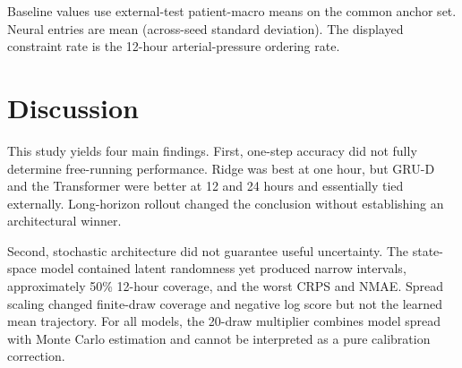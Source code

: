 \documentclass[conference]{IEEEtran}
\begin{document}
\begin{table}[!t]
\centering
\caption{Descriptive zero-shot external-test results. Neural values are mean (across-seed standard deviation).}
\label{tab:external-results}
\end{table}

Baseline values use external-test patient-macro means on the common anchor set.
Neural entries are mean (across-seed standard deviation). The displayed
constraint rate is the 12-hour arterial-pressure ordering rate.

\section{Discussion}\label{discussion}

This study yields four main findings. First, one-step accuracy did not fully
determine free-running performance. Ridge was best at one hour, but GRU-D and
the Transformer were better at 12 and 24 hours and essentially tied
externally. Long-horizon rollout changed the conclusion without establishing
an architectural winner.

Second, stochastic architecture did not guarantee useful uncertainty. The
state-space model contained latent randomness yet produced narrow intervals,
approximately 50\% 12-hour coverage, and the worst CRPS and NMAE. Spread
scaling changed finite-draw coverage and negative log score but not the learned
mean trajectory. For all models, the 20-draw multiplier combines model spread
with Monte Carlo estimation and cannot be interpreted as a pure calibration
correction.
\end{document}
